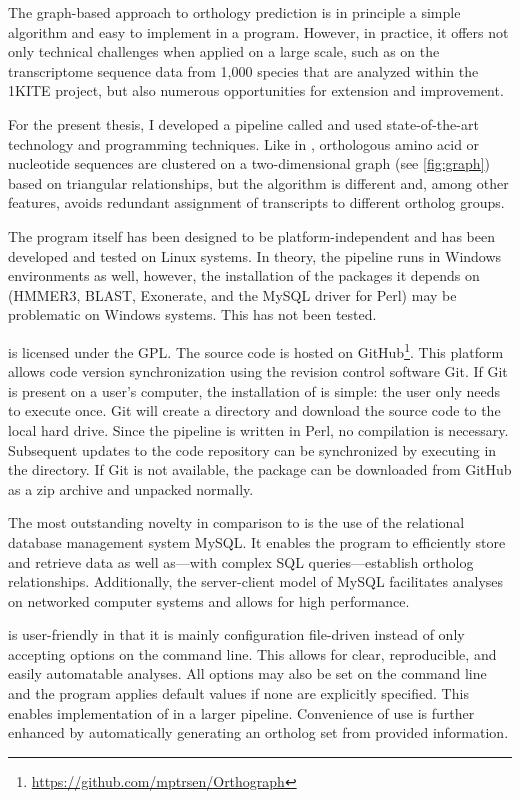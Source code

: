 The graph-based approach to orthology prediction is in principle a simple
algorithm and easy to implement in a program. However, in practice, it offers
not only technical challenges when applied on a large scale, such as on the
transcriptome sequence data from 1,000 species that are analyzed within the
1KITE project, but also numerous opportunities for extension and improvement. 

For the present thesis, I developed a pipeline called \pname and used
state-of-the-art technology and programming techniques. Like in \hamstr,
orthologous amino acid or nucleotide sequences are clustered on a
two-dimensional graph (see \autoref{fig:graph}) based on triangular
relationships, but the algorithm is different and, among other features, avoids
redundant assignment of transcripts to different ortholog groups.

The program itself has been designed to be platform-independent and has been
developed and tested on Linux systems.  In theory, the pipeline runs in Windows
environments as well, however, the installation of the packages it depends on
(HMMER3, BLAST, Exonerate, and the MySQL driver for Perl) may be problematic on
Windows systems. This has not been tested.

\pname is licensed under the GPL. The source code is hosted on
GitHub\footnote{\url{https://github.com/mptrsen/Orthograph}}. This platform
allows code version synchronization using the revision control software Git. If
Git is present on a user's computer, the installation of \pname is simple: the
user only needs to execute  once. Git will create a directory and
download the source code to the local hard drive. Since the pipeline is written
in Perl, no compilation is necessary. Subsequent updates to the code repository
can be synchronized by executing  in the \pname directory. If Git
is not available, the package can be downloaded from GitHub as a zip archive and
unpacked normally.

The most outstanding novelty in comparison to \hamstr is the use of the
relational database management system MySQL. It enables the program to
efficiently store and retrieve data as well as---with complex SQL
queries---establish ortholog relationships. Additionally, the server-client
model of MySQL facilitates analyses on networked computer systems and allows for
high performance.

\pname is user-friendly in that it is mainly configuration file-driven instead
of only accepting options on the command line. This allows for clear,
reproducible, and easily automatable analyses. All options may also be set on
the command line and the program applies default values if none are explicitly
specified. This enables implementation of \pname in a larger pipeline.
Convenience of use is further enhanced by automatically generating an ortholog
set from provided information.

